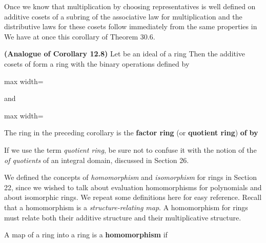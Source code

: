 \documentclass[11pt,oneside]{article}
\begin{document}
\begin{BookBody}
Once we know that multiplication by choosing representatives is well defined on additive cosets of a subring  of  the associative law for multiplication and the distributive laws for these cosets follow immediately from the same properties in  We have at once this corollary of Theorem 30.6.

 \textbf{(Analogue of Corollary 12.8)} Let  be an ideal of a ring  Then the additive cosets of  form a ring  with the binary operations defined by

\begin{center}\begin{adjustbox}{max width=\linewidth}\end{adjustbox}\end{center}

\noindent and

\begin{center}\begin{adjustbox}{max width=\linewidth}\end{adjustbox}\end{center} \BookEnd{\blacklozenge}

 The ring  in the preceding corollary is the\textbf{ factor ring} (or\textbf{ quotient ring})\textbf{ of}  \textbf{by} \BookEnd{\blacksquare}

If we use the term\textit{ quotient ring}, be sure not to confuse it with the notion of the  \textit{of quotients} of an integral domain, discussed in Section 26.


\noindent We defined the concepts of\textit{ homomorphism} and\textit{ isomorphism} for rings in Section 22, since we wished to talk about evaluation homomorphisms for polynomials and about isomorphic rings. We repeat some definitions here for easy reference. Recall that a homomorphism is a\textit{ structure-relating map}. A homomorphism for rings must relate both their additive structure and their multiplicative structure.

 A map \BookInline{\phi } of a ring  into a ring  is a\textbf{ homomorphism} if


\end{BookBody}
\end{document}
